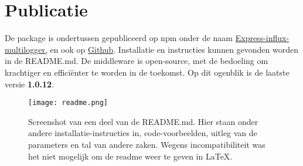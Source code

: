 \section{Publicatie}
\label{sec:publication}

De package is ondertussen gepubliceerd op npm onder de naam \href{https://www.npmjs.com/package/express-influx-multilogger}{Express-influx-multilogger,} en ook op \href{https://github.com/LeunensMichiel/express-influx-multilogger}{Github}. Installatie en instructies kunnen gevonden worden in de README.md. De middleware is open-source, met de bedoeling om krachtiger en efficiënter te worden in de toekomst. Op dit ogenblik is de laatste versie \textbf{1.0.12}.

\begin{figure}[h]
	\centering
	\texttt{[image: readme.png]}
	\caption{Screenshot van een deel van de README.md. Hier staan onder andere installatie-instructies in, code-voorbeelden, uitleg van de parameters en tal van andere zaken. Wegens incompatibiliteit was het niet mogelijk om de readme weer te geven in LaTeX.}
	\label{fig:readme}
\end{figure}